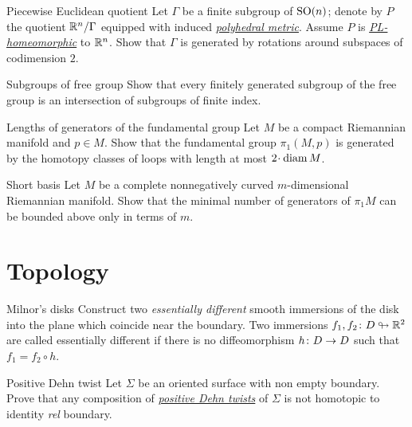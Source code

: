 \documentclass[twoside]{book}
\begin{document}
{{}

\begin{pr}{\easy}{Piecewise Euclidean quotient}\label{Piecewise Euclidean quotient}
Let $\Gamma$ be a finite subgroup of $\mathrm{SO}(n)$; 
denote by $P$ the quotient $\mathbb{R}^n/\Gamma$ equipped with induced \hyperref[Polyhedral space]{\emph{polyhedral metric}}.
Assume $P$ is \hyperref[PL-homeomorphism]{\emph{PL-homeomorphic}} to $\mathbb{R}^n$.
Show that $\Gamma$ is generated by rotations  around subspaces of codimension $2$.
\end{pr}

\begin{pr}{\easy}{Subgroups of free group}\label{Subgroups of free group}
Show that every finitely generated subgroup of the free group 
is an intersection of subgroups of finite index.
\end{pr}

\begin{pr}{\easy}{Lengths of generators of the fundamental group}\label{Lengths of generators of the fundamental group}
Let $M$ be a compact Riemannian manifold and $p\in M$.
Show that the fundamental group $\pi_1(M,p)$
is generated by the homotopy classes of loops with length at most $2\cdot\diam M$.
\end{pr}

\begin{pr}{}{Short basis}\label{Short basis}
Let $M$ be a complete nonnegatively curved $m$-dimensional Riemannian manifold.
Show that the minimal number of generators of $\pi_1 M$
can be bounded above only in terms of $m$.
\end{pr}



\chapter{Topology}

\begin{pr}{}{Milnor's disks}\label{Milnor's disks} 
Construct two \emph{essentially different} smooth immersions of the disk 
into the plane which coincide near the boundary. 
Two immersions $f_1,f_2\colon D\looparrowright \mathbb{R}^2$ are called essentially different 
if there is no diffeomorphism $h\:D\z\to D$ such that
$f_1=f_2\circ h$.
\end{pr}

\begin{pr}{\easy}{Positive Dehn twist}\label{Positive Dehn twist} Let $\Sigma$ be an oriented surface with non empty boundary.
Prove that any composition of \hyperref[Dehn twist]{\emph{positive Dehn twists}} of $\Sigma$ is not homotopic to identity \emph{rel} boundary.
\end{pr}

}
\end{document}
